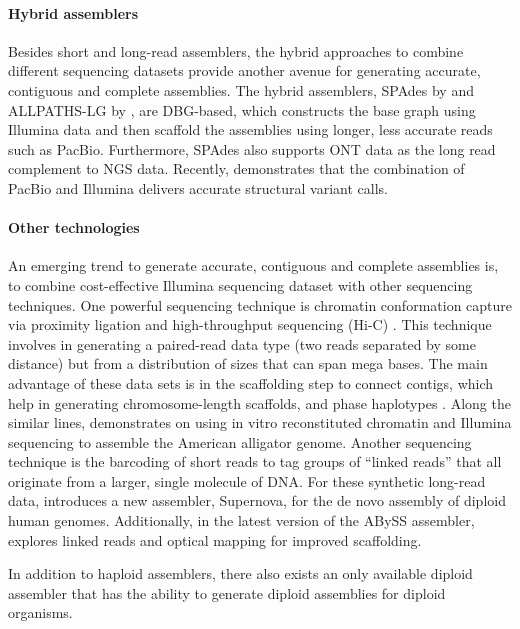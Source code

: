 \paragraph{Hybrid assemblers}
Besides short and long-read assemblers, the hybrid approaches to combine different sequencing datasets provide another avenue for generating accurate, contiguous and complete assemblies. 
The hybrid assemblers, SPAdes by \cite{bankevich2012spades} and ALLPATHS-LG by \cite{gnerre2011high}, are DBG-based, which constructs the base graph using Illumina data and then scaffold the assemblies using longer, less accurate reads such as PacBio. 
Furthermore, SPAdes also supports ONT data as the long read complement to NGS data. 
Recently, \cite{fan2017hysa} demonstrates that the combination of PacBio and Illumina delivers accurate structural variant calls.

\paragraph{Other technologies}
An emerging trend to generate accurate, contiguous and complete assemblies is, to combine cost-effective Illumina sequencing dataset with other sequencing techniques. 
One powerful sequencing technique is chromatin conformation capture via proximity ligation and high-throughput sequencing (Hi-C) \citep{lieberman2009comprehensive}. 
This technique involves in generating a paired-read data type (two reads separated by some distance) but from a distribution of sizes that can span mega bases. 
The main advantage of these data sets is in the scaffolding step to connect contigs, which help in generating chromosome-length scaffolds, and phase haplotypes \citep{burton2013chromosome, selvaraj2013whole}. 
Along the similar lines, \cite{rice2017improved} demonstrates on using in vitro reconstituted chromatin and Illumina sequencing to assemble the American alligator genome. 
Another sequencing technique is the barcoding of short reads to tag groups of ``linked reads'' that all originate from a larger, single molecule of DNA. 
For these synthetic long-read data, \cite{weisenfeld2017direct} introduces a new assembler, Supernova, for the de novo assembly of diploid human genomes. 
Additionally, in the latest version of the ABySS assembler, \cite{jackman2017abyss} explores linked reads and optical mapping for improved scaffolding.

In addition to haploid assemblers, there also exists an only available diploid assembler that has the ability to generate diploid assemblies for diploid organisms.  
